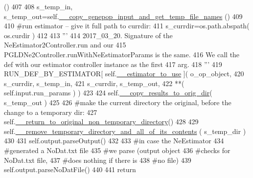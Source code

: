 \begin{DoxyCode}
      ()
407 
408         s\_temp\_in, s\_temp\_out=self.\hyperlink{classnegui_1_1pgopneestimator_1_1PGOpNeEstimator_a0242b3d35cd51d8c9e7db35c334ebdfd}{\_\_copy\_genepop\_input\_and\_get\_temp\_file\_names}
      ()   
409 
410         \textcolor{comment}{#run estimator -- give it full path to currdir:}
411         s\_currdir=os.path.abspath( os.curdir )
412 
413         \textcolor{stringliteral}{'''}
414 \textcolor{stringliteral}{        2017\_03\_20.  Signature of the NeEstimator2Controller.run and our}
415 \textcolor{stringliteral}{        PGLDNe2Controller.runWithNeEstimatorParams is the same.}
416 \textcolor{stringliteral}{        We call the def with our estimator controller instance as the first}
417 \textcolor{stringliteral}{        arg.  }
418 \textcolor{stringliteral}{        '''}
419         RUN\_DEF\_BY\_ESTIMATOR[ self.\hyperlink{classnegui_1_1pgopneestimator_1_1PGOpNeEstimator_a77a1d96335902820fda22a07c902045e}{\_\_estimator\_to\_use} ]( o\_op\_object,
420                                                         s\_currdir, s\_temp\_in, 
421                                                         s\_currdir, s\_temp\_out, 
422                                                     **( self.input.run\_params  ) )
423 
424         self.\hyperlink{classnegui_1_1pgopneestimator_1_1PGOpNeEstimator_a4a1a0f7ebbd7c1ebd72255fc8f7748b9}{\_\_copy\_results\_to\_orig\_dir}( s\_temp\_out )
425             
426         \textcolor{comment}{#make the current directory the original, before the change to a temporary dir:}
427         self.\hyperlink{classnegui_1_1pgopneestimator_1_1PGOpNeEstimator_a084e6f1689e71b1abf7184c2c9f98955}{\_\_return\_to\_original\_non\_temporary\_directory}()
428 
429         self.\hyperlink{classnegui_1_1pgopneestimator_1_1PGOpNeEstimator_ab5416e660197ec2854e7e78baba67361}{\_\_remove\_temporary\_directory\_and\_all\_of\_its\_contents}
      ( s\_temp\_dir )
430         
431         self.output.parseOutput()
432 
433         \textcolor{comment}{#in case the NeEstimator}
434         \textcolor{comment}{#generated a NoDat.txt file}
435         \textcolor{comment}{#we parse (output object}
436         \textcolor{comment}{#checks for NoDat.txt file,}
437         \textcolor{comment}{#does nothing if there is }
438         \textcolor{comment}{#no file)}
439         self.output.parseNoDatFile()
440         
441         \textcolor{keywordflow}{return}
\end{DoxyCode}
